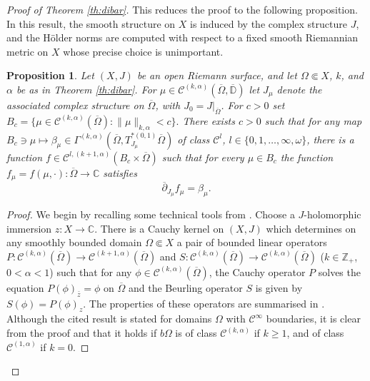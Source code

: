 \documentclass[10pt,a4paper]{amsart}
\newtheorem{proposition}{Proposition}
\newcommand\C{\mathbb{C}}
\newcommand\Cscr{\mathscr{C}}
\newcommand\D{\overline{\mathbb D}}
\newcommand\Z{\mathbb{Z}}
\newcommand\dibar{\overline\partial}
\begin{document}
\begin{proof}[Proof of Theorem \ref{th:dibar}]
This reduces the proof to the following proposition.
In this result, the smooth structure on $X$ is induced  
by the complex structure $J$, and the H\"older norms are 
computed with respect to a fixed smooth Riemannian metric on $X$
whose precise choice is unimportant. 

%
%
\begin{proposition}\label{prop:dibar}
Let $(X,J)$ be an open Riemann surface, 
and let $\Omega\Subset X$, $k$, and $\alpha$ be as in Theorem \ref{th:dibar}.  
For $\mu\in \Cscr^{(k,\alpha)}(\overline \Omega,\D)$ let $J_\mu$ 
denote the associated complex structure on $\overline\Omega$, 
with $J_0=J|_{\overline \Omega}$. For $c>0$ set 
$
	B_c=\{\mu \in \Cscr^{(k,\alpha)}(\overline\Omega) : 
	\|\mu\|_{k,\alpha} <c\}.
$
There exists $c>0$ such that for any map 
$B_c\ni \mu \mapsto \beta_\mu \in  
\Gamma^{(k,\alpha)}(\overline\Omega,T^{*(0,1)}_{J_\mu}\overline\Omega)$
of class $\Cscr^l$, $l\in \{0,1,\ldots,\infty,\omega\}$, 
there is a function 
$f\in \Cscr^{l,(k+1,\alpha)}(B_c\times \overline\Omega)$ 
such that for every $\mu \in B_c$
the function $f_\mu=f(\mu,\cdotp):\overline\Omega\to\C$ satisfies 
\begin{equation}\label{eq:dibar2}
	\dibar_{J_\mu} f_\mu = \beta_\mu. 
\end{equation}
\end{proposition}

\begin{proof}
We begin by recalling some
technical tools from \cite[Secs.\ 3-4]{Forstneric2024Runge}.
Choose a $J$-holomorphic immersion $z:X\to\C$.  
There is a Cauchy kernel on $(X,J)$ which determines on any 
smoothly bounded domain $\Omega\Subset X$ a pair 
of bounded linear operators 
$P:\Cscr^{(k,\alpha)}(\overline \Omega) \to \Cscr^{(k+1,\alpha)}(\overline \Omega)$ and 
$S:\Cscr^{(k,\alpha)}(\overline \Omega) \to \Cscr^{(k,\alpha)}(\overline \Omega)$
($k\in\Z_+$, $0<\alpha<1$) such that 
for any $\phi\in \Cscr^{(k,\alpha)}(\overline \Omega)$, the 
Cauchy operator $P$ solves the equation
$P(\phi)_{\bar z}=\phi$ on $\overline \Omega$ and 
the Beurling operator $S$ is given by $S(\phi)=P(\phi)_z$. 
The properties of these operators are summarised in 
\cite[Theorem 3.2]{Forstneric2024Runge}. 
Although the cited result is stated for domains $\Omega$
with $\Cscr^\infty$ boundaries, it is clear from the proof and 
\cite[Lemma 6.37]{GilbargTrudinger1983} that it holds 
if $b\Omega$ is of class $\Cscr^{(k,\alpha)}$ if $k\ge 1$, 
and of class $\Cscr^{(1,\alpha)}$ if $k=0$.


\end{proof}
\end{proof}
\end{document}
